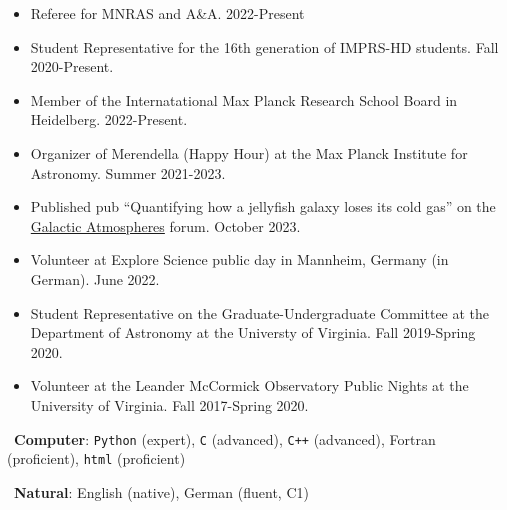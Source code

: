 \documentclass[a4paper,10pt,oneside]{article}
\begin{document}
\noindent{}

\begin{itemize}[wide, labelwidth=!, labelindent=-11pt, parsep=0pt]
    \item Referee for MNRAS and A\&A. 2022-Present
    \item Student Representative for the 16th generation of IMPRS-HD students. Fall 2020-Present. 
    \item Member of the Internatational Max Planck Research School Board in Heidelberg. 2022-Present.
    \item Organizer of Merendella (Happy Hour) at the Max Planck Institute for Astronomy. Summer 2021-2023.
    \item Published pub ``Quantifying how a jellyfish galaxy loses its cold gas'' on the \href{https://galacticatmospheres.pubpub.org/pub/8t27n1yz/release/1}{Galactic Atmospheres} forum. October 2023.
    \item Volunteer at Explore Science public day in Mannheim, Germany (in German). June 2022.
    \item Student Representative on the Graduate-Undergraduate Committee at the Department of Astronomy at the Universty of Virginia. Fall 2019-Spring 2020.
    \item Volunteer at the Leander McCormick Observatory Public Nights at the University of Virginia. Fall 2017-Spring 2020.
\end{itemize}

\noindent{}

\vspace{5.5pt}

\noindent \hspace{-19pt} \faKeyboardO\ {\bf Computer}: \texttt{Python} (expert), \texttt{C} (advanced), \texttt{C++} (advanced), Fortran (proficient), \texttt{html} (proficient)

\vspace{5.5pt}

\noindent \hspace{-17pt} \faLanguage\ {\bf Natural}: English (native), German (fluent, C1) \\

\begin{comment}
\vspace{11pt} 
{\it Last updated \today.}
\end{comment}
\end{document}
